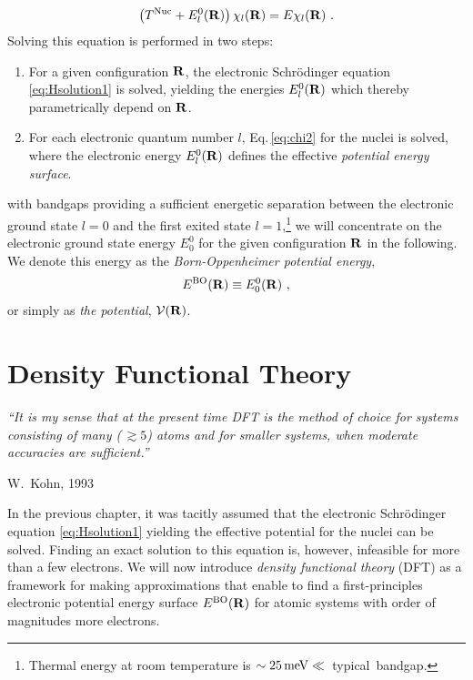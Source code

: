 \begin{align}
    \left( T^{\rm Nuc} + E^0_l({\bf R}) \right) \chi_l ({\bf R})
        = E \chi_l ({\bf R})~.
    \label{eq:chi2}
\end{align}
Solving this equation is performed in two steps:
\begin{enumerate}
    \item For a given configuration $\bf R$, the electronic Schr\"odinger equation \eqref{eq:Hsolution1} is solved, yielding the energies $E^0_l({\bf R})$ which thereby parametrically depend on $\bf R$.
    \item For each electronic quantum number $l$, Eq.\,\eqref{eq:chi2} for the nuclei is solved, where the electronic energy $E^0_l({\bf R})$ defines the effective \emph{potential energy surface}.
\end{enumerate}

 with bandgaps providing a sufficient energetic separation between the electronic ground state $l=0$ and the first exited state $l=1$,\footnote{Thermal energy at room temperature is \mbox{$\sim 25\,{\rm meV} \ll $~typical bandgap}.} we will concentrate on the electronic ground state energy $E^0_0$ for the given configuration ${\bf R}$ in the following. We denote this energy as the \emph{Born-Oppenheimer potential energy},
\begin{align}
	E^{\rm BO} ({\bf R}) \equiv E^0_0 ({\bf R})~,
	\label{eq:E^BO}
\end{align}
or simply as \emph{the potential}, $\mathcal V ({\bf R}) $.

\newpage
\section{Density Functional Theory}
\epigraph{\singlespacing \it ``It is my sense that at the present time DFT is the method of choice for systems consisting of many (\,$\gtrsim 5$) atoms and for smaller systems, when moderate accuracies are sufficient.''}{W.~Kohn, 1993}

In the previous chapter, it was tacitly assumed that the electronic Schr\"odinger equation \eqref{eq:Hsolution1} yielding the effective potential for the nuclei can be solved. Finding an exact solution to this equation is, however, infeasible for more than a few electrons. We will now introduce \emph{density functional theory} (DFT) as a framework for making approximations that enable to find a first-principles electronic potential energy surface $E^{\rm BO} ({\bf R})$ for atomic systems with order of magnitudes more electrons.


